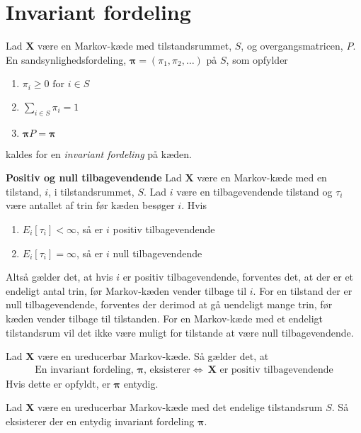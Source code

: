 \section{Invariant fordeling}

\begin{defn}\textbf{} %
\newline
Lad $\bm X$ være en Markov-kæde med tilstandsrummet, $S$, og overgangsmatricen, $P$. En sandsynlighedsfordeling, $\bm\pi=(\pi_1,\pi_2,\dots)$ på $S$, som opfylder
\begin{enumerate}
    \item $\pi_i\geq 0 \text{ for } i\in S$
    \item $\displaystyle\sum_{i\in S} \pi_i=1$
    \item $\bm\pi P=\bm\pi$
\end{enumerate}
kaldes for en \textit{invariant fordeling} på kæden. 
\end{defn}

\begin{defn}\textbf{Positiv og null tilbagevendende} %
\newline
Lad $\bm X$ være en Markov-kæde med en tilstand, $i$, i tilstandsrummet, $S$. Lad $i$ være en tilbagevendende tilstand og $\tau_i$ være antallet af trin før kæden besøger $i$. Hvis
\begin{enumerate}
    \item $E_i[\tau_i]<\infty$, så er $i$ positiv tilbagevendende
    \item $E_i[\tau_i]=\infty$, så er $i$ null tilbagevendende
\end{enumerate}
\end{defn}

Altså gælder det, at hvis $i$ er positiv tilbagevendende, forventes det, at der er et endeligt antal trin, før Markov-kæden vender tilbage til $i$. For en tilstand der er null tilbagevendende, forventes der derimod at gå uendeligt mange trin, før kæden vender tilbage til tilstanden. For en Markov-kæde med et endeligt tilstandsrum vil det ikke være muligt for tilstande at være null tilbagevendende. 

\begin{minipage}\textwidth
\begin{thmx} \textbf{} %
\newline
Lad $\bm X$ være en ureducerbar Markov-kæde. Så gælder det, at 
\begin{align*}
    \text{En invariant fordeling, } \bm \pi \text{, eksisterer} \Leftrightarrow \ \bm X \text{ er positiv tilbagevendende}
\end{align*}
Hvis dette er opfyldt, er $\bm\pi$ entydig. 
\end{thmx}
\end{minipage}

\begin{minipage}\textwidth
\begin{pro} \textbf{} %
\newline
Lad $\bm X$ være en ureducerbar Markov-kæde med det endelige tilstandsrum $S$. Så eksisterer der en entydig invariant fordeling $\bm \pi$.
\end{pro}
\end{minipage}